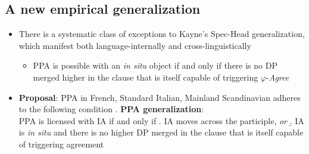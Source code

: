 \documentclass[letterpaper,10pt]{handout_nick}
\begin{document}
\subsection{A new empirical generalization}
\begin{itemize}
\item There is a systematic class of exceptions to Kayne's Spec-Head generalization, which manifest both language-internally and cross-linguistically
\begin{itemize}
\item PPA is possible with an \emph{in situ} object if and only if there is no DP merged higher in the clause that is itself capable of triggering $\varphi$-\emph{Agree} 
\end{itemize}
\item {\bf Proposal}: PPA in French, Standard Italian, Mainland Scandinavian adheres to the following condition
\ex.\label{psh} {\bf PPA generalization}:\\
PPA is licensed with IA if and only if
\a. IA moves across the participle, \emph{or}
\b. IA is \emph{in situ} and there is no higher DP merged in the clause that is itself capable of triggering agreement

\end{itemize}
\end{document}
